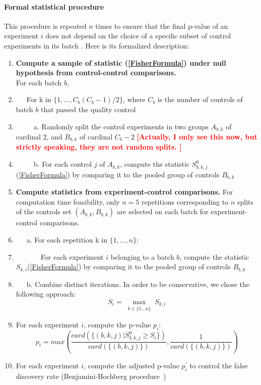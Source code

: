 \paragraph*{Formal statistical procedure\\}
This procedure is repeated $n$ times to ensure that the final p-value of an experiment $i$ does not depend on the choice of a specific subset of control experiments in its batch%
. Here is its formalized description:
\begin{enumerate}
\item {\bf Compute a sample of statistic (\ref{FisherFormula})  under null hypothesis from control-control comparisons.}\\ For each batch $b$,
\item[] \ \ \
 For k in $\{1,\ldots,C_b(C_b-1)/2\}$, where $C_b$ is the number of controls of batch $b$ that passed the quality control
\item[] \ \ \ \ \ a. Randomly split the control experiments in two
  groups $A_{b,k}$ of cardinal $2$, and $B_{b,k}$ of cardinal $C_b-2$
  \textcolor{red}{\bf [Actually, I only see this now, but strictly
    speaking, they are not random splits. ]}
\item[] \ \ \ \ \ b. For each control $j$ of $A_{b,k}$, compute the statistic $S^{0}_{b,k,j}$ (\ref{FisherFormula}) by comparing it to the pooled group of controls $B_{b,k}$

\item {\bf Compute statistics from experiment-control comparisons.} For computation time feasibility, only $n=5$ repetitions corresponding to $n$ splits of the controls set $(A_{b,k}, B_{b,k})$ are selected on each batch for experiment-control comparisons. 
\item[] \ \ \ a. For each repetition k in $\{1,\ldots,n\}$:
\item[]\ \ \ \ \ \ \ For each experiment $i$  belonging to a batch $b$, compute the statistic $S_{k,i}$(\ref{FisherFormula}) by comparing it to the pooled group of controls $B_{b,k}$
\item[] \ \ \  b. Combine distinct iterations. In order to be conservative, we chose the following approach:
\begin{equation}
S_{i} = {\max}_{\substack{k \in \{1\ldots n \}}} S_{k,i}
\end{equation}

\item  For each experiment $i$, compute the p-value $p_{i}$:
\[p_{i} =max \left( \dfrac{card( \{(b,k,j) | S^{0}_{b,k,j}\geq S_{i} \})}
{card( \{ (b,k,j) \})},
 \dfrac{1}
 {card( \{ (b,k,j) \})}\right) \]
\item For each experiment $i$, compute the adjusted p-value $p^\prime_{i}$ to control the false discovery rate (Benjamini-Hochberg procedure~\cite{Benjamini1})
\end{enumerate}
